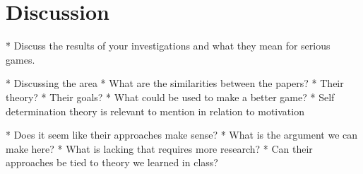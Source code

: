 \section{Discussion}
* Discuss the results of your investigations and what they mean for serious games.

    * Discussing the area
    * What are the similarities between the papers?
        * Their theory?
        * Their goals?
        * What could be used to make a better game?
    * Self determination theory is relevant to mention in relation to motivation

    * Does it seem like their approaches make sense?
        * What is the argument we can make here?
            * What is lacking that requires more research?
        * Can their approaches be tied to theory we learned in class?